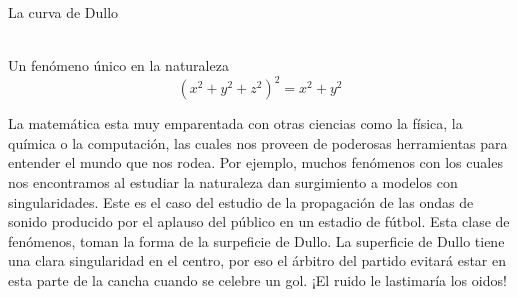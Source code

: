 \documentclass[es]{../../common/SurferDesc}%
\begin{document}
\footnotesize


\begin{surferPage}
  \begin{surferTitle}La curva de Dullo\end{surferTitle}  
  \\
Un fenómeno único en la naturaleza\\
\smallskip
\[(x^2+ y^2+ z^2)^2	= x^2+ y^2\]

\singlespacing
La matemática esta muy emparentada con otras ciencias como la física, la química o la computación, las cuales nos proveen de poderosas herramientas para entender el mundo que nos rodea. 
\singlespacing
Por ejemplo, muchos fenómenos con los cuales nos encontramos al estudiar la naturaleza dan surgimiento a modelos con singularidades.
\singlespacing
Este es el caso del estudio de la propagación de las ondas de sonido producido por el aplauso del público en un estadio de fútbol. Esta clase de fenómenos, toman la forma de la surpeficie de Dullo. La superficie de Dullo tiene una clara singularidad en el centro, por eso el árbitro del partido evitará estar en esta parte de la cancha cuando se celebre un gol. ¡El ruido le lastimaría los oidos!


  \begin{surferText}
     \end{surferText}
\end{surferPage}
\end{document}
